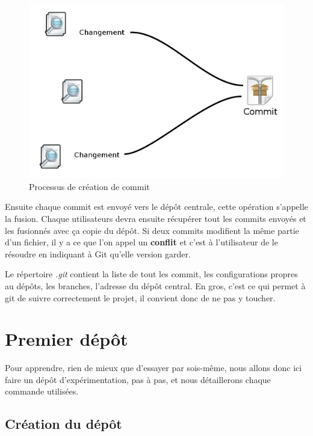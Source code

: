 \documentclass[a4paper]{article}
\begin{document}
\begin{figure}[h]
\centering
\label{figure_commit}
\includegraphics[scale=0.25]{commit.png}
\caption{Processus de création de commit}
\end{figure}

Ensuite chaque commit est envoyé vers le dépôt centrale, cette opération s'appelle la fusion. Chaque utilisateurs devra ensuite récupérer tout les commits envoyés et les fusionnés avec ça copie du dépôt. Si deux commits modifient la même partie d'un fichier, il y a ce que l'on appel un \textbf{conflit} et c'est à l'utilisateur de le résoudre en indiquant à Git qu'elle version garder.

Le répertoire \emph{.git} contient la liste de tout les commit, les configurations propres au dépôts, les branches, l'adresse du dépôt central. En gros, c'est ce qui permet à git de suivre correctement le projet, il convient donc de ne pas y toucher.


\section{Premier dép\^ot}

Pour apprendre, rien de mieux que d'essayer par sois-même, nous allons donc ici faire un dépôt d'expérimentation, pas à pas, et nous détaillerons chaque commande utilisées.

\subsection{Création du dép\^ot}
\end{document}
